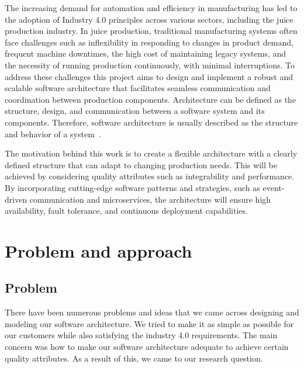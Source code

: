 \documentclass[conference]{IEEEtran}
\begin{document}
\color{black}

The increasing demand for automation and efficiency in manufacturing has led to the adoption of Industry 4.0 principles across various sectors, including the juice production industry.
In juice production, traditional manufacturing systems often face challenges such as inflexibility in responding to changes in product demand, frequent machine downtimes, the high cost of maintaining legacy systems, and the necessity of running production continuously, with minimal interruptions.
To address these challenges this project aims to design and implement a robust and scalable software architecture that facilitates seamless communication and coordination between production components. Architecture can be defined as the structure, design, and communication between a software system and its components. Therefore, software architecture is usually described as the structure and behavior of a system~\cite{b12}.

The motivation behind this work is to create a flexible architecture with a clearly defined structure that can adapt to changing production needs. This will be achieved by considering quality attributes such as integrability and performance. By incorporating cutting-edge software patterns and strategies, such as event-driven communication and microservices, the architecture will ensure high availability, fault tolerance, and continuous deployment capabilities.

\section{Problem and approach}
\color{blue}
\color{black}

\subsection{Problem}
There have been numerous problems and ideas that we came across designing and modeling our software architecture. We tried to make it as simple as possible for our customers while also satisfying the industry 4.0 requirements. The main concern was how to make our software architecture adequate to achieve certain quality attributes. As a result of this, we came to our research question.
\end{document}

